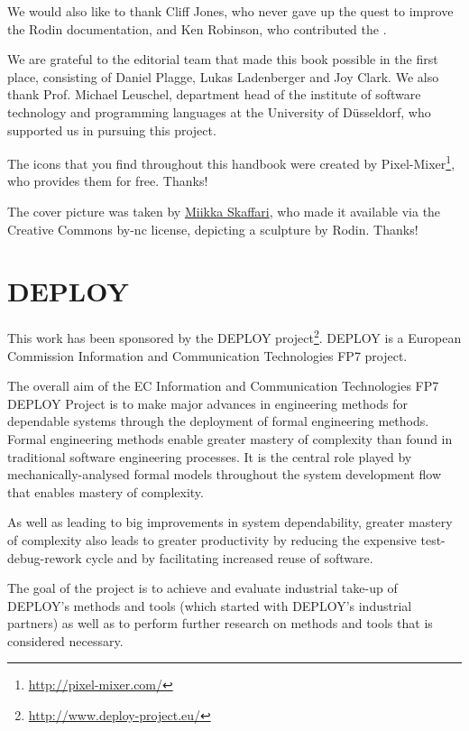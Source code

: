 \documentclass[12pt]{book}
\begin{document}
We would also like to thank Cliff Jones, who never gave up the quest to improve the Rodin documentation, and Ken Robinson, who contributed the .

We are grateful to the editorial team that made this book possible in the first place, consisting of Daniel Plagge, Lukas Ladenberger and Joy Clark.  We also thank Prof. Michael Leuschel, department head of the institute of software technology and programming languages at the University of Düsseldorf, who supported us in pursuing this project.

The icons that you find throughout this handbook were created by Pixel-Mixer\footnote{\url{http://pixel-mixer.com/}}, who provides them for free.  Thanks!

The cover picture was taken by \href{http://www.skaffari.fi/}{Miikka Skaffari}, who made it available via the Creative Commons by-nc license, depicting a sculpture by Rodin.  Thanks!

\section{DEPLOY}
\label{deploy}

This work has been sponsored by the DEPLOY project\footnote{\url{http://www.deploy-project.eu/}}.  DEPLOY is a European Commission Information and Communication Technologies FP7 project.

The overall aim of the EC Information and Communication Technologies FP7 DEPLOY Project is to make major advances in engineering methods for dependable systems through the deployment of formal engineering methods. Formal engineering methods enable greater mastery of complexity than found in traditional software engineering processes. It is the central role played by mechanically-analysed formal models throughout the system development flow that enables mastery of complexity.

As well as leading to big improvements in system dependability, greater mastery of complexity also leads to greater productivity by reducing the expensive test-debug-rework cycle and by facilitating increased reuse of software.

The goal of the project is to achieve and evaluate industrial take-up of DEPLOY's methods and tools (which started with DEPLOY's industrial partners) as well as to perform further research on methods and tools that is considered necessary.



% 







\clearpage
{}
{} 
\printindex
\end{document}
